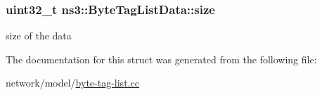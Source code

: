 \subsubsection[{\texorpdfstring{size}{size}}]{\setlength{\rightskip}{0pt plus 5cm}uint32\+\_\+t ns3\+::\+Byte\+Tag\+List\+Data\+::size}\hypertarget{structns3_1_1ByteTagListData_a47780cb505d6617e2bc9d27616deec99}{}\label{structns3_1_1ByteTagListData_a47780cb505d6617e2bc9d27616deec99}


size of the data 



The documentation for this struct was generated from the following file\+:\begin{DoxyCompactItemize}
\item 
network/model/\hyperlink{byte-tag-list_8cc}{byte-\/tag-\/list.\+cc}\end{DoxyCompactItemize}

